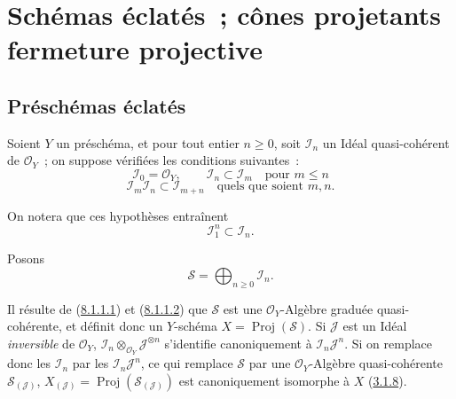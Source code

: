 \section{Schémas éclatés~; cônes projetants fermeture projective}
\label{section:II.8-fr}

\subsection{Préschémas éclatés}
\label{subsection:II.8.1-fr}

\begin{env}[8.1.1]
\label{II.8.1.1-fr}
Soient $Y$ un préschéma, et pour tout entier $n\geq0$, soit $\mathcal{I}_n$ un
Idéal quasi-cohérent de $\mathcal{O}_Y$~; on suppose vérifiées les conditions
suivantes~:
\begin{equation}
\label{II.8.1.1.1-fr}
  \mathcal{I}_0=\mathcal{O}_Y,\qquad
  \mathcal{I}_n\subset\mathcal{I}_m\quad\text{pour }m\leq n
\tag{8.1.1.1}
\end{equation}
\begin{equation}
\label{II.8.1.1.2-fr}
  \mathcal{I}_m\mathcal{I}_n\subset\mathcal{I}_{m+n}
  \quad\text{quels que soient }m,n.
\tag*{8.1.1.2)}
\end{equation}

On notera que ces hypothèses entraînent
\begin{equation}
\label{II.8.1.1.3-fr}
  \mathcal{I}_1^n\subset\mathcal{I}_n.
\tag{8.1.1.3}
\end{equation}

Posons
\begin{equation}
\label{II.8.1.1.4-fr}
  \mathcal{S}=\bigoplus_{n\geq0}\mathcal{I}_n.
\tag{8.1.1.4}
\end{equation}

Il résulte de (\hyperref[II.8.1.1.1-fr]{8.1.1.1}) et
(\hyperref[II.8.1.1.2-fr]{8.1.1.2}) que $\mathcal{S}$ est une
$\mathcal{O}_Y$-Algèbre graduée quasi-cohérente, et définit donc un $Y$-schéma
$X=\operatorname{Proj}(\mathcal{S})$. Si $\mathcal{J}$ est un Idéal
\emph{inversible} de $\mathcal{O}_Y$,
$\mathcal{I}_n\otimes_{\mathcal{O}_Y}\mathcal{J}^{\otimes n}$ s'identifie
canoniquement à $\mathcal{I}_n\mathcal{J}^n$. Si on remplace donc les
$\mathcal{I}_n$ par les $\mathcal{I}_n\mathcal{J}^n$, ce qui remplace
$\mathcal{S}$ par une $\mathcal{O}_Y$-Algèbre quasi-cohérente
$\mathcal{S}_{(\mathcal{J})}$,
$X_{(\mathcal{J})}=\operatorname{Proj}(\mathcal{S}_{(\mathcal{J})})$ est
canoniquement isomorphe à $X$ (\hyperref[II.3.1.8-fr]{3.1.8}).
\end{env}

